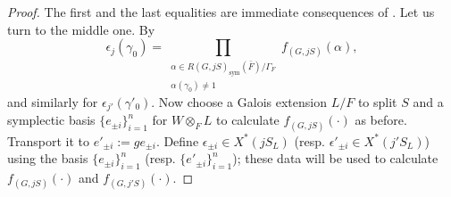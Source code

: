 \documentclass[a4paper,10pt]{article}
\begin{document}
\begin{proof}
	The first and the last equalities are immediate consequences of \cite[Lemma 4.12]{Kal15}. Let us turn to the middle one. By \cite[Lemma 4.12]{Kal15}
	\[ \epsilon_j(\gamma_0) = \prod_{\substack{\alpha \in R(G, jS)_\text{sym}(\bar{F}) /\Gamma_F \\ \alpha(\gamma_0) \neq 1 }} f_{(G, jS)}(\alpha), \]
	and similarly for $\epsilon_{j'}(\gamma'_0)$. Now choose a Galois extension $L/F$ to split $S$ and a symplectic basis $\{ e_{\pm i}\}_{i=1}^n$ for $W \otimes_F L$ to calculate $f_{(G, jS)}(\cdot)$ as before. Transport it to $e'_{\pm i} := g e_{\pm i}$. Define $\epsilon_{\pm i} \in X^*(jS_L)$ (resp. $\epsilon'_{\pm i} \in X^*(j'S_L)$) using the basis $\{e_{\pm i}\}_{i=1}^n$ (resp. $\{e'_{\pm i}\}_{i=1}^n$); these data will be used to calculate  $f_{(G, jS)}(\cdot)$ and $f_{(G, j'S)}(\cdot)$.



\end{proof}
\end{document}
